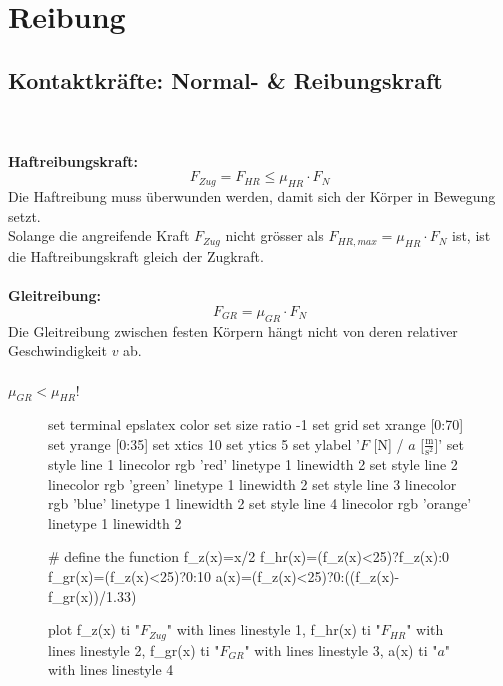 \section{Reibung}
\subsection{Kontaktkr\"afte: Normal- \& Reibungskraft}

\\\\
\newline
\newline
\textbf{Haftreibungskraft:}\\
\[
	\boxed{F_{Zug}=F_{HR}\leq\mu_{HR}\cdot F_N}
\]
\newline
Die Haftreibung muss \"uberwunden werden, damit sich der K\"orper in Bewegung setzt.\\
Solange die angreifende Kraft $F_{Zug}$ nicht gr\"osser als $F_{HR,max}=\mu_{HR}\cdot F_N$ ist, ist die Haftreibungskraft gleich der Zugkraft.\\ 
\\
\textbf{Gleitreibung:}\\
\[
	\boxed{F_{GR}=\mu_{GR}\cdot F_N}
\]
\newline
Die Gleitreibung zwischen festen K\"orpern h\"angt nicht von deren relativer Geschwindigkeit $v$ ab.\\
\\
$\mu_{GR}<\mu_{HR}$!\\
\begin{figure}[htbp]
	\centering
	\begin{gnuplot}[scale=0.75]
		set terminal epslatex color
		set size ratio -1
		set grid
		set xrange [0:70]
		set yrange [0:35]
		set xtics 10
		set ytics 5
		set ylabel '$F$ [N] / $a$ [$\mathrm{\frac{m}{s^2}}$]'
		set style line 1 linecolor rgb 'red' linetype 1 linewidth 2
		set style line 2 linecolor rgb 'green' linetype 1 linewidth 2
		set style line 3 linecolor rgb 'blue' linetype 1 linewidth 2
		set style line 4 linecolor rgb 'orange' linetype 1 linewidth 2
		
		# define the function
		f_z(x)=x/2
		f_hr(x)=(f_z(x)<25)?f_z(x):0
		f_gr(x)=(f_z(x)<25)?0:10
		a(x)=(f_z(x)<25)?0:((f_z(x)-f_gr(x))/1.33)
		
		plot f_z(x) ti "$F_{Zug}$" with lines linestyle 1, f_hr(x) ti "$F_{HR}$" with lines linestyle 2, f_gr(x) ti "$F_{GR}$" with lines linestyle 3, a(x) ti "$a$" with lines linestyle 4
	\end{gnuplot}
\end{figure}
